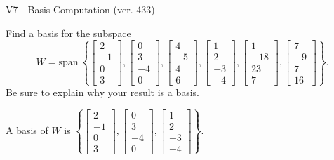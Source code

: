 \begin{exercise}
  \begin{exerciseTitle}V7 - Basis Computation (ver. 433)\end{exerciseTitle}
  \begin{exerciseStatement}
    Find a basis for the subspace 
\[W=\mathrm{span}\ \left\{\left[\begin{array}{r}
2 \\
-1 \\
0 \\
3
\end{array}\right] , \left[\begin{array}{r}
0 \\
3 \\
-4 \\
0
\end{array}\right] , \left[\begin{array}{r}
4 \\
-5 \\
4 \\
6
\end{array}\right] , \left[\begin{array}{r}
1 \\
2 \\
-3 \\
-4
\end{array}\right] , \left[\begin{array}{r}
1 \\
-18 \\
23 \\
7
\end{array}\right] , \left[\begin{array}{r}
7 \\
-9 \\
7 \\
16
\end{array}\right]\right\}.\]
 Be sure to explain why your result is a basis.


  \end{exerciseStatement}
  \begin{exerciseAnswer}
   A basis of \(W\) is  \(\left\{\left[\begin{array}{r}
2 \\
-1 \\
0 \\
3
\end{array}\right] , \left[\begin{array}{r}
0 \\
3 \\
-4 \\
0
\end{array}\right] , \left[\begin{array}{r}
1 \\
2 \\
-3 \\
-4
\end{array}\right]\right\}\).
  


  \end{exerciseAnswer}
\end{exercise}